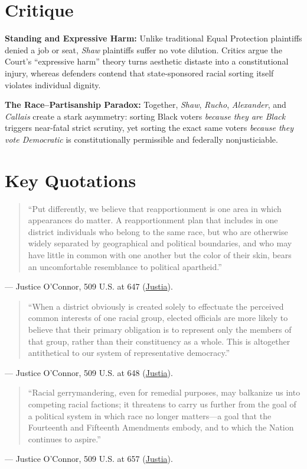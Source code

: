 \documentclass[12pt]{article}
\begin{document}
\section{Critique}
\textbf{Standing and Expressive Harm:} Unlike traditional Equal Protection plaintiffs denied a job or seat, \textit{Shaw} plaintiffs suffer no vote dilution. Critics argue the Court's ``expressive harm'' theory turns aesthetic distaste into a constitutional injury, whereas defenders contend that state-sponsored racial sorting itself violates individual dignity.

\textbf{The Race--Partisanship Paradox:} Together, \textit{Shaw}, \textit{Rucho}, \textit{Alexander}, and \textit{Callais} create a stark asymmetry: sorting Black voters \textit{because they are Black} triggers near-fatal strict scrutiny, yet sorting the exact same voters \textit{because they vote Democratic} is constitutionally permissible and federally nonjusticiable.

\section{Key Quotations}
\begin{quote}
``Put differently, we believe that reapportionment is one area in which appearances do matter. A reapportionment plan that includes in one district individuals who belong to the same race, but who are otherwise widely separated by geographical and political boundaries, and who may have little in common with one another but the color of their skin, bears an uncomfortable resemblance to political apartheid.''
\end{quote}
\noindent --- Justice O'Connor, 509 U.S. at 647 (\href{https://supreme.justia.com/cases/federal/us/509/630/}{Justia}).

\begin{quote}
``When a district obviously is created solely to effectuate the perceived common interests of one racial group, elected officials are more likely to believe that their primary obligation is to represent only the members of that group, rather than their constituency as a whole. This is altogether antithetical to our system of representative democracy.''
\end{quote}
\noindent --- Justice O'Connor, 509 U.S. at 648 (\href{https://supreme.justia.com/cases/federal/us/509/630/}{Justia}).

\begin{quote}
``Racial gerrymandering, even for remedial purposes, may balkanize us into competing racial factions; it threatens to carry us further from the goal of a political system in which race no longer matters---a goal that the Fourteenth and Fifteenth Amendments embody, and to which the Nation continues to aspire.''
\end{quote}
\noindent --- Justice O'Connor, 509 U.S. at 657 (\href{https://supreme.justia.com/cases/federal/us/509/630/}{Justia}).
\end{document}
